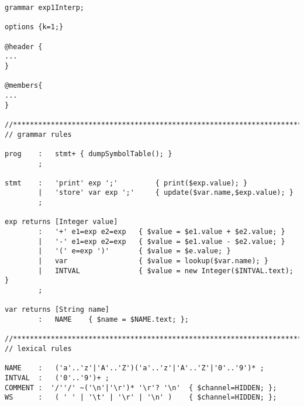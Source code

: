 \begin{minipage}{4.8in}
\begin{lstlisting}[frame=single,language=antlr]
grammar exp1Interp;

options {k=1;}

@header {
...
}

@members{
...
}

//**********************************************************************
// grammar rules

prog 	:	stmt+ { dumpSymbolTable(); } 
		;

stmt	:	'print' exp ';'			{ print($exp.value); }
		|	'store' var exp ';'		{ update($var.name,$exp.value); }
		;

exp returns [Integer value]
	   	:   '+' e1=exp e2=exp 	{ $value = $e1.value + $e2.value; }
   		|   '-' e1=exp e2=exp 	{ $value = $e1.value - $e2.value; }
		|	'(' e=exp ')' 		{ $value = $e.value; }
		|	var 				{ $value = lookup($var.name); }
		|	INTVAL				{ $value = new Integer($INTVAL.text); }
		;
	
var	returns [String name] 
		:	NAME 	{ $name = $NAME.text; };

//**********************************************************************
// lexical rules

NAME	:	('a'..'z'|'A'..'Z')('a'..'z'|'A'..'Z'|'0'..'9')* ;
INTVAL	:	('0'..'9')+ ;
COMMENT :  '/''/' ~('\n'|'\r')* '\r'? '\n' 	{ $channel=HIDDEN; };
WS  	:   ( ' ' | '\t' | '\r' | '\n' ) 	{ $channel=HIDDEN; };
\end{lstlisting}
\end{minipage}